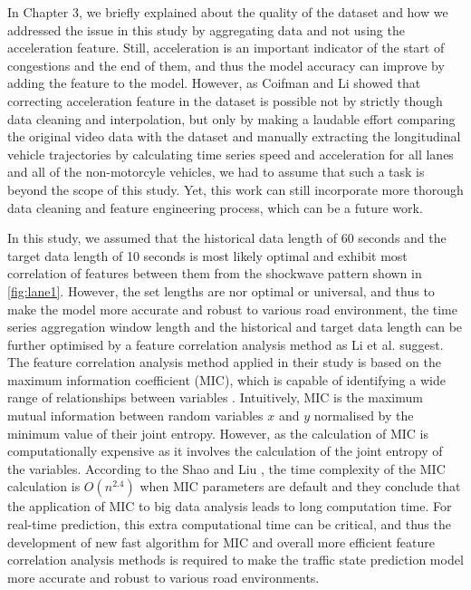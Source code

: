 \documentclass[11pt]{uonthesis}
\begin{document}
In Chapter 3, we briefly explained about the quality of the dataset and how we addressed the issue in this study by aggregating data and not using the acceleration feature. Still, acceleration is an important indicator of the start of congestions and the end of them, and thus the model accuracy can improve by adding the feature to the model. However, as Coifman and Li \cite{COIFMAN2017362} showed that correcting acceleration feature in the dataset is possible not by strictly though data cleaning and interpolation, but only by making a laudable effort comparing the original video data with the dataset and manually extracting the longitudinal vehicle trajectories by calculating time series speed and acceleration for all lanes and all of the non-motorcyle vehicles, we had to assume that such a task is beyond the scope of this study. Yet, this work can still incorporate more thorough data cleaning and feature engineering process, which can be a future work.

In this study, we assumed that the historical data length of 60 seconds and the target data length of 10 seconds is most likely optimal and exhibit most correlation of features between them from the shockwave pattern shown in \ref{fig:lane1}. %
However, the set lengths are nor optimal or universal, and thus to make the model more accurate and robust to various road environment, the time series aggregation window length and the historical and target data length can be further optimised by a feature correlation analysis method as Li et al. \cite{9284587} suggest. The feature correlation analysis method applied in their study is based on the maximum information coefficient (MIC), which is capable of identifying a wide range of relationships between variables \cite{mic}. %
Intuitively, MIC is the maximum mutual information between random variables $x$ and $y$ normalised by the minimum value of their joint entropy. However, as the calculation of MIC is computationally expensive as it involves the calculation of the joint entropy of the variables. According to the Shao and Liu \cite{miccomplexity}, the time complexity of the MIC calculation is $O(n^{2.4})$ when MIC parameters are default and they conclude that the application of MIC to big data analysis leads to long computation time. For real-time prediction, this extra computational time can be critical, and thus the development of new fast algorithm for MIC and overall more efficient feature correlation analysis methods is required to make the traffic state prediction model more accurate and robust to various road environments.
\end{document}
